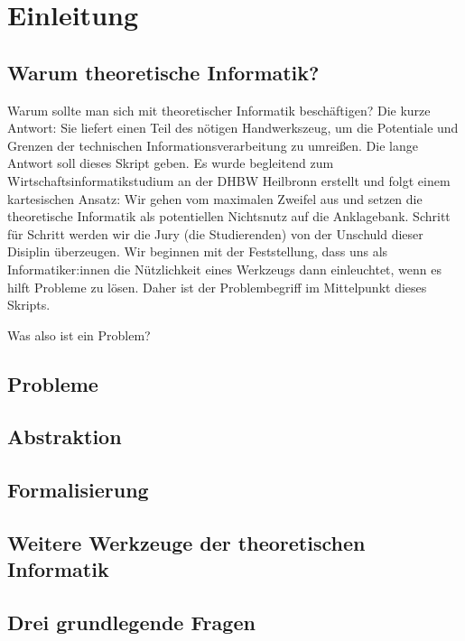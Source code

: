 \chapter{Einleitung}
\section{Warum theoretische Informatik?}
Warum sollte man sich mit theoretischer Informatik beschäftigen?
Die kurze Antwort: Sie liefert einen Teil des nötigen Handwerkszeug,
um die Potentiale und Grenzen der technischen Informationsverarbeitung zu umreißen.
Die lange Antwort soll dieses Skript geben.
Es wurde begleitend zum Wirtschaftsinformatikstudium an der DHBW Heilbronn erstellt
und folgt einem kartesischen Ansatz:
Wir gehen vom maximalen Zweifel aus und setzen die theoretische Informatik 
als potentiellen Nichtsnutz auf die Anklagebank.
Schritt für Schritt werden wir die Jury (die Studierenden) von der Unschuld dieser
Disiplin überzeugen.
Wir beginnen mit der Feststellung, dass uns als Informatiker:innen die Nützlichkeit
eines Werkzeugs dann einleuchtet, wenn es hilft Probleme zu lösen. 
Daher ist der Problembegriff im Mittelpunkt dieses Skripts.

Was also ist ein Problem?
\section{Probleme}
\section{Abstraktion}
\section{Formalisierung}
\section{Weitere Werkzeuge der theoretischen Informatik}
\section{Drei grundlegende Fragen}
